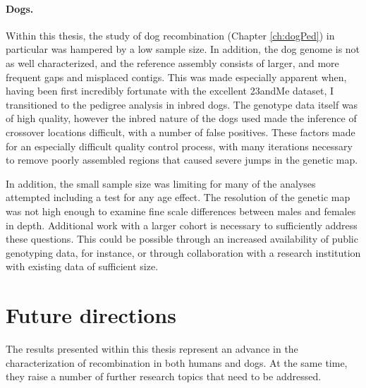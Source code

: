 \paragraph{Dogs.}
Within this thesis, the study of dog recombination (Chapter \ref{ch:dogPed}) in particular was hampered by a low sample size.
In addition, the dog genome is not as well characterized, and the reference assembly consists of larger, and more frequent gaps and misplaced contigs.
This was made especially apparent when, having been first incredibly fortunate with the excellent 23andMe dataset, I transitioned to the pedigree analysis in inbred dogs.
The genotype data itself was of high quality, however the inbred nature of the dogs used made the inference of crossover locations difficult, with a number of false positives.
These factors made for an especially difficult quality control process, with many iterations necessary to remove poorly assembled regions that caused severe jumps in the genetic map.

In addition, the small sample size was limiting for many of the analyses attempted including a test for any age effect.
The resolution of the genetic map was not high enough to examine fine scale differences between males and females in depth.
Additional work with a larger cohort is necessary to sufficiently address these questions.
This could be possible through an increased availability of public genotyping data, for instance, or through collaboration with a research institution with existing data of sufficient size.




\section{Future directions}

The results presented within this thesis represent an advance in the characterization of recombination in both humans and dogs.
At the same time, they raise a number of further research topics that need to be addressed.

